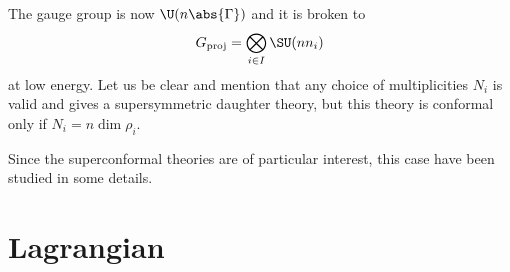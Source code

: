 \documentclass{worksheetclass}
\begin{document}
    The gauge group is now $\U(n\abs{\Gamma})$ and it is broken to
    \begin{equation}
        G_{\text{proj}}=\bigotimes_{i\in I}\SU(n n_i)
    \end{equation}
    at low energy. Let us be clear and mention that any choice of multiplicities $N_i$ is valid and gives a supersymmetric daughter theory, but this theory is conformal only if $N_i=n\dim\rho_i$.

    Since the superconformal theories are of particular interest, this case have been studied in some details.

\section{Lagrangian}
\end{document}
